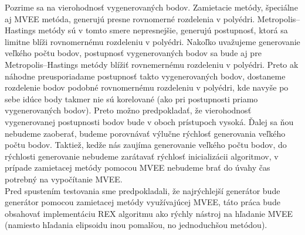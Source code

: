 Pozrime sa na vierohodnosť vygenerovaných bodov. Zamietacie metódy, špeciálne aj MVEE metóda, generujú presne rovnomerné rozdelenia v polyédri. Metropolis--Hastings metódy sú v tomto smere nepresnejšie, generujú postupnosť, ktorá sa limitne blíži rovnomernému rozdeleniu v polyédri. Nakoľko uvažujeme generovanie veľkého počtu bodov, postupnosť vygenerovaných bodov sa bude aj pre Metropolis--Hastings metódy blížiť rovnemernému rozdeleniu v polyédri. Preto ak náhodne preusporiadame postupnosť takto vygenerovaných bodov, dostaneme rozdelenie bodov podobné rovnomernému rozdeleniu v polyédri, kde navyše po sebe idúce body takmer nie sú korelované (ako pri postupnosti priamo vygenerovaných bodov). Preto možno predpokladať, že vierohodnosť vygenerovanej postupnosti bodov bude v oboch prístupoch vysoká. Ďalej sa ňou nebudeme zaoberať, budeme porovnávať výlučne rýchlosť generovania veľkého počtu bodov. Taktiež, kedže nás zaujíma generovanie veľkého počtu bodov, do rýchlosti generovanie nebudeme zarátavať rýchlosť inicializácii algoritmov, v prípade zamietacej metódy pomocou MVEE nebudeme brať do úvahy čas potrebný na vypočítanie MVEE.\\

Pred spustením testovania sme predpokladali, že najrýchlejší generátor bude generátor pomocou zamietacej metódy využívajúcej MVEE, táto práca bude obsahovať implementáciu REX algoritmu ako rýchly nástroj na hľadanie MVEE (namiesto hľadania elipsoidu inou pomalšou, no jednoduchšou metódou).
